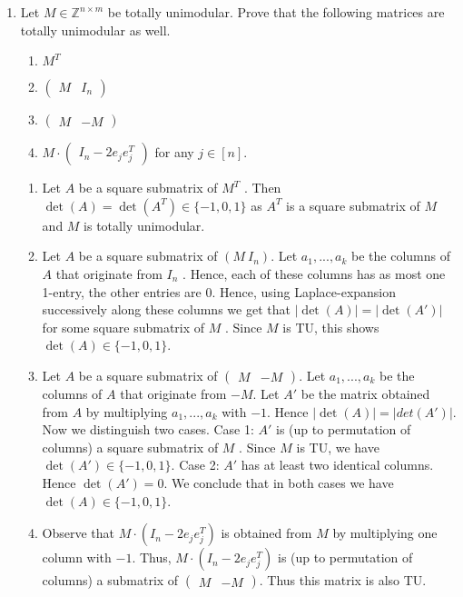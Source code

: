 \documentclass[11pt]{article}
\institute{\'Ecole Polytechnique F\'ed\'erale de Lausanne}
\newcommand{\setZ}{\mathbb{Z}}
\begin{document}
\makeheader

\begin{enumerate}[1)]

\item Let $M ∈ \setZ^{n×m}$ be totally unimodular. Prove that the following matrices are totally unimodular as well. 
\begin{enumerate}
\item $M^T$
\item $\begin{pmatrix} M & I_n \end{pmatrix}$
\item $\begin{pmatrix} M & -M \end{pmatrix}$
\item $M\cdot \begin{pmatrix} I_n− 2e_j e_j^T\end{pmatrix}$ for any $j \in [n]$. 
\end{enumerate}


\begin{solution}
\begin{enumerate}
\item Let $A$ be a square submatrix of $M^T$ . Then
$\det(A)= \det(A^T ) ∈ \{−1,0,1\}$
as $A^T$ is a square submatrix of $M$ and $M$ is totally unimodular.

\item Let $A$ be a square submatrix of $(M \ I_n)$. Let $a_1,..., a_k$ be the columns of $A$ that originate from $I_n$ . Hence, each of these columns has as most one 1-entry, the other entries are 0. Hence, using Laplace-expansion successively along these columns we get
that $|\det(A)| = | \det(A')|$ for some square submatrix of $M$ . Since $M$ is TU, this shows
$\det(A) ∈ \{−1,0,1\}$.

\item Let $A$ be a square submatrix of $\begin{pmatrix} M&  -M \end{pmatrix}$. Let $a_1,..., a_k$ be the columns of $A$ that
originate from $−M$. Let $A'$ be the matrix obtained from $A$ by multiplying $a_1,..., a_k$ with
$-1$. Hence
$| \det(A)| = | det(A')|$.
Now we distinguish two cases.
Case 1: $A'$ is (up to permutation of columns) a square submatrix of $M$ . Since $M$ is TU,
we have $\det(A') ∈ \{−1,0,1\}$.
Case 2: $A'$ has at least two identical columns. Hence $\det(A')= 0$.
We conclude that in both cases we have $\det(A) ∈ \{−1,0,1\}$.
\item Observe that $M\cdot (I_n− 2e_j e_j^T)$ is obtained from $M$ by multiplying one column with $-1$.
Thus, $M\cdot (I_n− 2e_j e_j^T)$ is (up to permutation of columns) a submatrix of  $\begin{pmatrix}M & -M\end{pmatrix}$. Thus this matrix is also TU. 
\end{enumerate}
\end{solution}



\end{enumerate}
\end{document}
